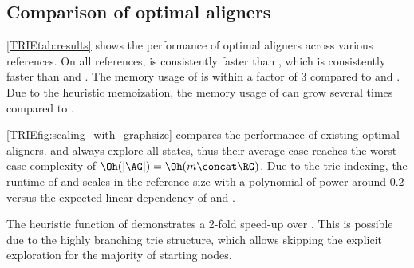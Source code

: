 \subsection{Comparison of optimal aligners}

\cref{TRIEtab:results} shows the performance of optimal aligners across various
references. On all references, \astarix is consistently faster than \dijkstra,
which is consistently faster than \pasgal and \bitparallel. The memory usage of
\dijkstra is within a factor of 3 compared to \pasgal and \bitparallel. Due to
the heuristic memoization, the memory usage of \astarix can grow several times
compared to \dijkstra.




\cref{TRIEfig:scaling_with_graphsize} compares the performance of existing optimal
aligners. \bitparallel and \pasgal always explore all states, thus their
average-case reaches the worst-case complexity of $\Oh(\lvert \AG \rvert) =
\Oh(m \concat \RG)$. Due to the trie indexing, the runtime of \astarix and
\dijkstra scales in the reference size with a polynomial of power around $0.2$
versus the expected linear dependency of \bitparallel and \pasgal.

The heuristic function of \astarix demonstrates a 2-fold speed-up over
\dijkstra. This is possible due to the highly branching trie structure, which
allows skipping the explicit exploration for the majority of starting nodes. 

